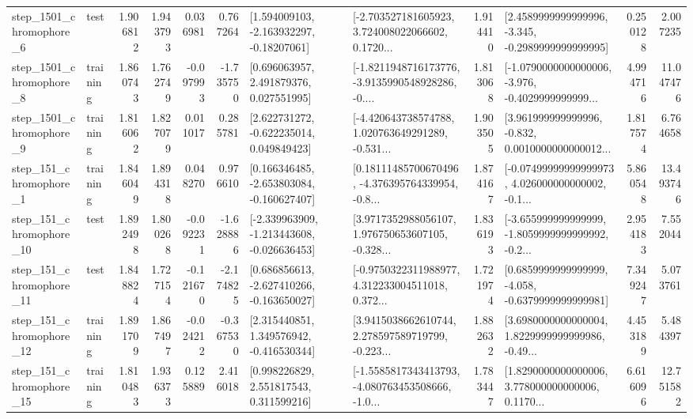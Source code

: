 \begin{tabular}{llrrrrllrlrr}
  step\_1501\_chromophore\_6 &      test &      1.906812 &    1.943793 &      0.036981 &  0.767264 &    [1.594009103, -2.163932297, -0.18207061] &  [-2.703527181605923, 3.724008022066602, 0.1720... &       1.914410 &  [2.4589999999999996, -3.345, -0.2989999999999995] &            0.250128 &          2.007235 \\
  step\_1501\_chromophore\_8 &  training &      1.860743 &    1.762749 &     -0.097993 & -1.735750 &     [0.696063957, 2.491879376, 0.027551995] &  [-1.8211948716173776, -3.9135990548928286, -0.... &       1.813068 &  [-1.0790000000000006, -3.976, -0.4029999999999... &            4.994716 &         11.047476 \\
  step\_1501\_chromophore\_9 &  training &      1.816062 &    1.827079 &      0.011017 &  0.285781 &    [2.622731272, -0.622235014, 0.049849423] &  [-4.420643738574788, 1.020763649291289, -0.531... &       1.903505 &  [3.961999999999996, -0.832, 0.0010000000000012... &            1.817574 &          6.764658 \\
   step\_151\_chromophore\_1 &  training &      1.846049 &    1.894318 &      0.048270 &  0.976610 &   [0.166346485, -2.653803084, -0.160627407] &  [0.18111485700670496, -4.376395764339954, -0.8... &       1.874167 &  [-0.07499999999999973, 4.026000000000002, -0.1... &            5.860548 &         13.493746 \\
  step\_151\_chromophore\_10 &      test &      1.892498 &    1.800268 &     -0.092231 & -1.628886 &  [-2.339963909, -1.213443608, -0.026636453] &  [3.9717352988056107, 1.976750653607105, -0.328... &       1.836193 &  [-3.655999999999999, -1.8059999999999992, -0.2... &            2.954183 &          7.552044 \\
  step\_151\_chromophore\_11 &      test &      1.848824 &    1.727154 &     -0.121670 & -2.174825 &   [0.686856613, -2.627410266, -0.163650027] &  [-0.9750322311988977, 4.312233004511018, 0.372... &       1.721974 &  [0.6859999999999999, -4.058, -0.6379999999999981] &            7.349247 &          5.073761 \\
  step\_151\_chromophore\_12 &  training &      1.891709 &    1.867497 &     -0.024212 & -0.367530 &    [2.315440851, 1.349576942, -0.416530344] &  [3.9415038662610744, 2.278597589719799, -0.223... &       1.882632 &  [3.6980000000000004, 1.8229999999999986, -0.49... &            4.453189 &          5.484397 \\
  step\_151\_chromophore\_15 &  training &      1.810483 &    1.936373 &      0.125889 &  2.416018 &     [0.998226829, 2.551817543, 0.311599216] &  [-1.5585817343413793, -4.080763453508666, -1.0... &       1.783447 &  [1.8290000000000006, 3.778000000000006, 0.1170... &            6.616096 &         12.751582 \\

\end{tabular}
